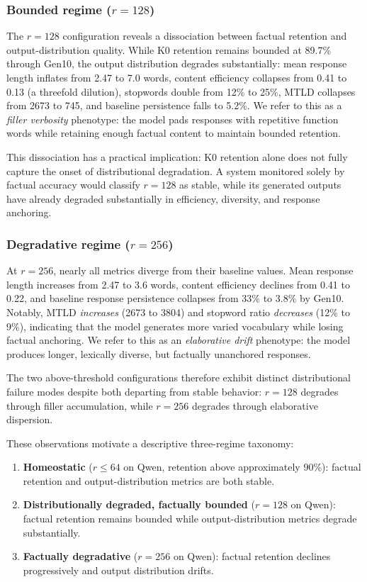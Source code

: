 \documentclass[a4paper,fleqn]{cas-dc}
\begin{document}
\subsubsection{Bounded regime ($r=128$)}
The $r=128$ configuration reveals a dissociation between factual retention and
output-distribution quality. While K0 retention remains bounded at 89.7\% through
Gen10, the output distribution degrades substantially: mean response length
inflates from 2.47 to 7.0 words, content efficiency collapses from 0.41 to 0.13
(a threefold dilution), stopwords double from 12\% to 25\%, MTLD collapses from
2673 to 745, and baseline persistence falls to 5.2\%. We refer to this as a
\textit{filler verbosity} phenotype: the model pads responses with repetitive
function words while retaining enough factual content to maintain bounded
retention.

This dissociation has a practical implication: K0 retention alone does not fully
capture the onset of distributional degradation. A system monitored solely by
factual accuracy would classify $r=128$ as stable, while its generated outputs
have already degraded substantially in efficiency, diversity, and response
anchoring.

\subsubsection{Degradative regime ($r=256$)}
At $r=256$, nearly all metrics diverge from their baseline values. Mean response
length increases from 2.47 to 3.6 words, content efficiency declines from 0.41
to 0.22, and baseline response persistence collapses from 33\% to 3.8\% by
Gen10. Notably, MTLD \textit{increases} (2673 to 3804) and stopword ratio
\textit{decreases} (12\% to 9\%), indicating that the model generates more
varied vocabulary while losing factual anchoring. We refer to this as an
\textit{elaborative drift} phenotype: the model produces longer, lexically
diverse, but factually unanchored responses.

The two above-threshold configurations therefore exhibit distinct distributional
failure modes despite both departing from stable behavior: $r=128$ degrades
through filler accumulation, while $r=256$ degrades through elaborative
dispersion.

These observations motivate a descriptive three-regime taxonomy:

\begin{enumerate}
    \item \textbf{Homeostatic} ($r \leq 64$ on Qwen, retention above
    approximately 90\%): factual retention and output-distribution metrics are
    both stable.
    \item \textbf{Distributionally degraded, factually bounded} ($r=128$ on
    Qwen): factual retention remains bounded while output-distribution metrics
    degrade substantially.
    \item \textbf{Factually degradative} ($r=256$ on Qwen): factual retention
    declines progressively and output distribution drifts.
\end{enumerate}
\end{document}
